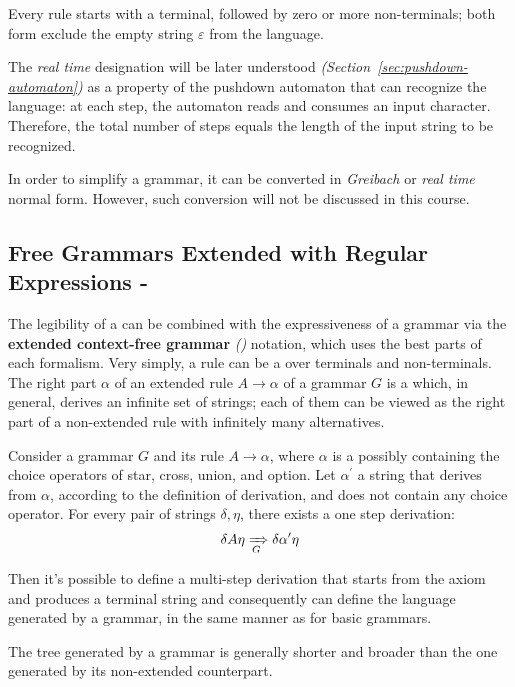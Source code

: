 \documentclass[english]{article}
\begin{document}
Every rule starts with a terminal, followed by zero or more non-terminals;
both form exclude the empty string \(\varepsilon\) from the language.

The \textit{real time} designation will be later understood \textit{(Section~\ref{sec:pushdown-automaton})} as a property of the pushdown automaton that can recognize the language:
at each step, the automaton reads and consumes an input character.
Therefore, the total number of steps equals the length of the input string to be recognized.

In order to simplify a grammar, it can be converted in \textit{Greibach} or \textit{real time} normal form.
However, such conversion will not be discussed in this course.

\subsection{Free Grammars Extended with Regular Expressions - \EBNF}
\label{sec:free-grammars-extended-with-regular-expressions}

The legibility of a \re can be combined with the expressiveness of a grammar via the \textbf{extended context-free grammar} \textit{(\EBNF)} notation, which uses the best parts of each formalism.
Very simply, a rule \RP can be a \re over terminals and non-terminals.
The right part \(\alpha\) of an extended rule \(A \rightarrow \alpha\) of a grammar \(G\) is a \re which, in general, derives an infinite set of strings;
each of them can be viewed as the right part of a non-extended rule with infinitely many alternatives.

Consider a grammar \(G\) and its rule \(A \rightarrow \alpha\), where \(\alpha\) is a \re possibly containing the choice operators of star, cross, union, and option.
Let \(\alpha^\prime\) a string that derives from \(\alpha\), according to the definition of \re derivation, and does not contain any choice operator.
For every pair of strings \(\delta, \eta\), there exists a one step derivation:
\[ \delta A \eta \xRightarrow[G]{} \delta \alpha^\prime \eta \]

Then it's possible to define a multi-step derivation that starts from the axiom and produces a terminal string and consequently can define the language generated by a \EBNF grammar, in the same manner as for basic grammars.

The tree generated by a \EBNF grammar is generally shorter and broader than the one generated by its non-extended counterpart.
\end{document}
